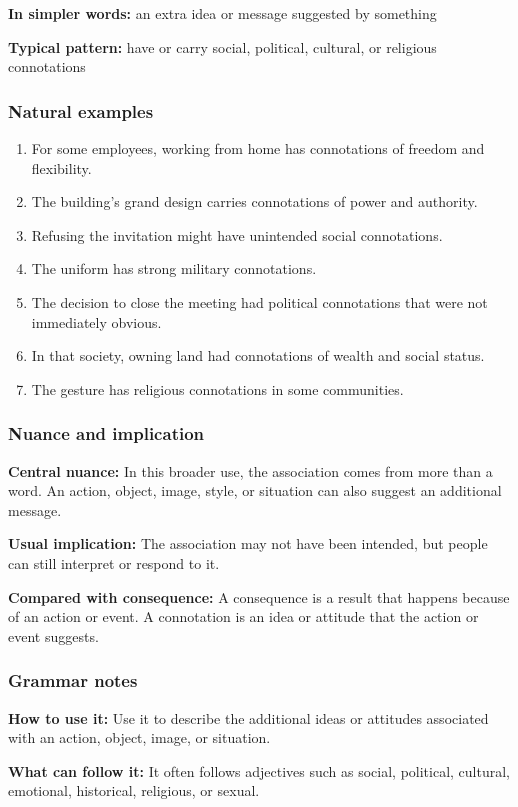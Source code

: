 \documentclass[11pt]{article}
\begin{document}
\textbf{In simpler words:} an extra idea or message suggested by something

\textbf{Typical pattern:} have or carry social, political, cultural, or religious connotations

\subsubsection{Natural examples}
\begin{enumerate}
  \item For some employees, working from home has connotations of freedom and flexibility.
  \item The building's grand design carries connotations of power and authority.
  \item Refusing the invitation might have unintended social connotations.
  \item The uniform has strong military connotations.
  \item The decision to close the meeting had political connotations that were not immediately obvious.
  \item In that society, owning land had connotations of wealth and social status.
  \item The gesture has religious connotations in some communities.
\end{enumerate}

\subsubsection{Nuance and implication}
\textbf{Central nuance:} In this broader use, the association comes from more than a word. An action, object, image, style, or situation can also suggest an additional message.

\textbf{Usual implication:} The association may not have been intended, but people can still interpret or respond to it.

\textbf{Compared with consequence:} A consequence is a result that happens because of an action or event. A connotation is an idea or attitude that the action or event suggests.

\subsubsection{Grammar notes}
\textbf{How to use it:} Use it to describe the additional ideas or attitudes associated with an action, object, image, or situation.

\textbf{What can follow it:} It often follows adjectives such as social, political, cultural, emotional, historical, religious, or sexual.
\end{document}
